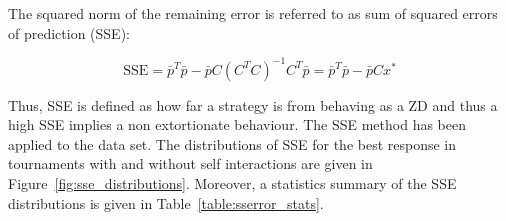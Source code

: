 \documentclass[10pt]{article}
\begin{document}
The squared norm of the remaining error is referred to as sum of squared errors
of prediction (SSE):

\begin{equation}\label{eqn:x_SSError_formula}
    \text{SSE} = {\bar{p}} ^ T \bar{p} -
           \bar{p} C \left(C ^ T C \right) ^ {-1} C ^ T \bar{p}
         = {\bar{p}} ^ T \bar{p} - \bar{p} C x ^ *
\end{equation}

Thus, SSE is defined as how far a strategy is from behaving as a ZD and thus a
high SSE implies a non extortionate behaviour. The SSE method has been applied
to the data set. The distributions of SSE for the best response in tournaments
with and without self interactions are given in
Figure~\ref{fig:sse_distributions}. Moreover, a statistics summary of the SSE
distributions is given in Table~\ref{table:sserror_stats}.

\begin{table}[!htbp]
    \begin{center}
    \end{center}
    \caption{SSE of best response memory-one when \(N=2\)}\label{table:sserror_stats}
\end{table}
\end{document}
